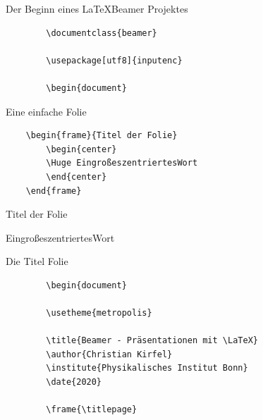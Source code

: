 \documentclass{beamer}
\begin{document}

\begin{frame}[containsverbatim]{Der Beginn eines \LaTeX Beamer Projektes}
    \begin{lstlisting}
        \documentclass{beamer}

        \usepackage[utf8]{inputenc}

        \begin{document}
    \end{lstlisting}
\end{frame}


\begin{frame}[containsverbatim]{Eine einfache Folie}
    \begin{lstlisting}
    \begin{frame}{Titel der Folie}
        \begin{center}
        \Huge EingroßeszentriertesWort
        \end{center}
    \end{frame}
    \end{lstlisting}
\end{frame}

\begin{frame}{Titel der Folie}
    \begin{center}
        \Huge EingroßeszentriertesWort
    \end{center}
\end{frame}


\begin{frame}{Die Titel Folie}
    \begin{lstlisting}
        \begin{document}

        \usetheme{metropolis}

        \title{Beamer - Präsentationen mit \LaTeX}
        \author{Christian Kirfel}
        \institute{Physikalisches Institut Bonn}
        \date{2020}

        \frame{\titlepage}
    \end{lstlisting}
\end{frame}

\frame{\titlepage}

\end{document}

